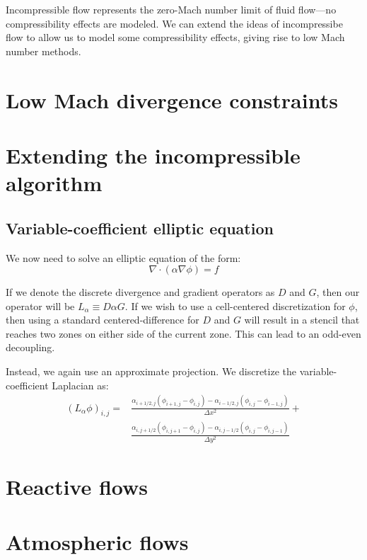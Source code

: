 Incompressible flow represents the zero-Mach number limit of fluid
flow---no compressibility effects are modeled.  We can extend the
ideas of incompressibe flow to allow us to model some compressibility
effects, giving rise to low Mach number methods.

\section{Low Mach divergence constraints}

\section{Extending the incompressible algorithm}

\subsection{Variable-coefficient elliptic equation}

We now need to solve an elliptic equation of the form:
\begin{equation}
\nabla \cdot (\alpha \nabla \phi) = f
\end{equation}

If we denote the discrete divergence and gradient operators as $D$ and $G$,
then our operator will be $L_\alpha \equiv D \alpha G$.  If we wish to
use a cell-centered discretization for $\phi$, then using a standard 
centered-difference for $D$ and $G$ will result in a stencil that reaches
two zones on either side of the current zone.  This can lead to an
odd-even decoupling. 


Instead, we again use an approximate projection.  We discretize the
variable-coefficient Laplacian as:
\begin{align}
(L_\alpha \phi)_{i,j} = 
 & \frac{\alpha_{i+1/2,j} (\phi_{i+1,j} - \phi_{i,j}) -
        \alpha_{i-1/2,j} (\phi_{i,j} - \phi_{i-1,j})}{\Delta x^2} + \\
 & \frac{\alpha_{i,j+1/2} (\phi_{i,j+1} - \phi_{i,j}) -
        \alpha_{i,j-1/2} (\phi_{i,j} - \phi_{i,j-1})}{\Delta y^2}
\end{align}

\section{Reactive flows}

\section{Atmospheric flows}

